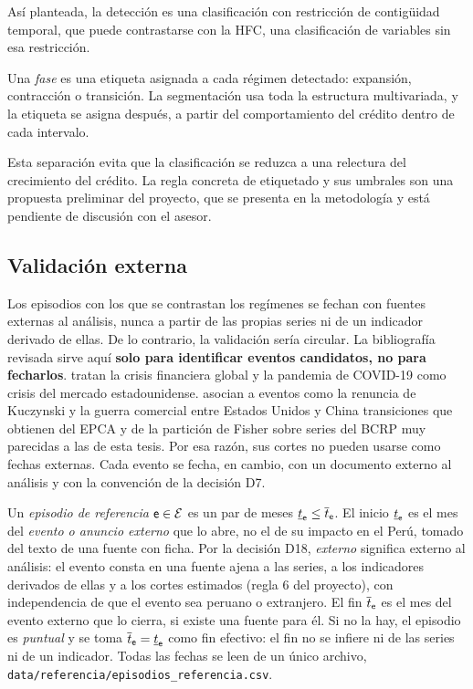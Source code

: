 Así planteada, la detección es una clasificación con restricción de contigüidad temporal, que
puede contrastarse con la HFC, una clasificación de variables sin esa restricción.

\begin{definicion}[Fase]\label{def:fase}
Una \emph{fase} es una etiqueta asignada a cada régimen detectado: expansión, contracción o
transición. La segmentación usa toda la estructura multivariada, y la etiqueta se asigna después,
a partir del comportamiento del crédito dentro de cada intervalo.
\end{definicion}

Esta separación evita que la clasificación se reduzca a una relectura del crecimiento del
crédito. La regla concreta de etiquetado y sus umbrales son una propuesta preliminar del
proyecto, que se presenta en la metodología y está pendiente de discusión con el asesor.

\subsection{Validación externa}
\label{sec:validacion}

Los episodios con los que se contrastan los regímenes se fechan con fuentes externas al análisis,
nunca a partir de las propias series ni de un indicador derivado de ellas. De lo contrario, la
validación sería circular. La bibliografía revisada sirve aquí \textbf{solo para identificar
eventos candidatos, no para fecharlos}. \textcite{tuhin_et_al_2025} tratan la crisis financiera
global y la pandemia de COVID-19 como crisis del mercado estadounidense.
\textcite{camiz_cerda_atoche_2026} asocian a eventos como la renuncia de Kuczynski y la guerra
comercial entre Estados Unidos y China transiciones que obtienen del EPCA y de la partición de
Fisher sobre series del BCRP muy parecidas a las de esta tesis. Por esa razón, sus cortes no
pueden usarse como fechas externas. Cada evento se fecha, en cambio, con un documento externo al
análisis y con la convención de la decisión D7.

\begin{definicion}\label{def:episodio}
Un \emph{episodio de referencia} $\mathsf{e}\in\mathcal{E}$ es un par de meses $\underline{t}_{\mathsf{e}}\le\overline{t}_{\mathsf{e}}$.
El inicio $\underline{t}_{\mathsf{e}}$ es el mes del \emph{evento o anuncio externo} que lo abre, no el de su
impacto en el Perú, tomado del texto de una fuente con ficha. Por la decisión D18,
\emph{externo} significa externo al análisis: el evento consta en una fuente ajena a las series,
a los indicadores derivados de ellas y a los cortes estimados (regla 6 del proyecto), con
independencia de que el evento sea peruano o extranjero. El fin $\overline{t}_{\mathsf{e}}$ es el mes del
evento externo que lo cierra, si existe una fuente para él. Si no la hay, el episodio es
\emph{puntual} y se toma $\overline{t}_{\mathsf{e}}=\underline{t}_{\mathsf{e}}$ como fin efectivo: el fin no se infiere ni de las
series ni de un indicador. Todas las fechas se leen de un único archivo,
\texttt{data/referencia/episodios\_referencia.csv}.
\end{definicion}

